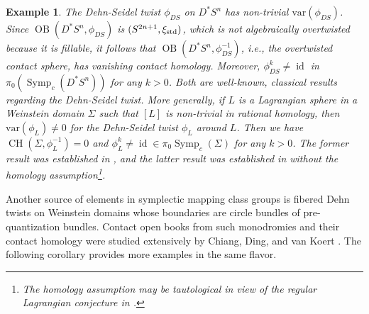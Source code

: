 \documentclass[11pt]{amsart}
\numberwithin{equation}{section}
\newtheorem{example}[theorem]{\textbf{Example}}
\def\std{\rm std}
\DeclareMathOperator{\Id}{id}
\DeclareMathOperator{\symp}{Symp}
\DeclareMathOperator{\OB}{OB}
\DeclareMathOperator{\CH}{CH}
\begin{document}
\begin{example}
    The Dehn-Seidel twist $\phi_{DS}$ on $D^*S^n$ has non-trivial $\mathrm{var}(\phi_{DS})$. Since $\OB(D^*S^n,\phi_{DS})$ is $(S^{2n+1},\xi_{\std})$, which is not algebraically overtwisted because it is fillable, it follows that $\OB(D^*S^n,\phi_{DS}^{-1})$, i.e., the overtwisted contact sphere, has vanishing contact homology. Moreover, $\phi_{DS}^k\ne \Id$ in $\pi_0(\symp_c(D^*S^n))$ for any $k>0$. Both are well-known, classical results regarding the Dehn-Seidel twist. More generally, if $L$ is a Lagrangian sphere in a Weinstein domain $\Sigma$ such that $[L]$ is non-trivial in rational homology, then $\mathrm{var}(\phi_{L})\ne 0$ for the Dehn-Seidel twist $\phi_L$ around $L$. Then we have $\CH(\Sigma,\phi_L^{-1})=0$ and $\phi_L^k \ne \Id \in \pi_0\symp_c(\Sigma)$ for any $k>0$. The former result was established in \cite{+1}, and the latter result was established in \cite{BGZ} without the homology assumption\footnote{The homology assumption may be tautological in view of the regular Lagrangian conjecture in \cite[Problem 2.5]{zbMATH07195660}.}.  
\end{example}

Another source of elements in symplectic mapping class groups is fibered Dehn twists on Weinstein domains whose boundaries are circle bundles of pre-quantization bundles. Contact open books from such monodromies and their contact homology were studied extensively by Chiang, Ding, and van Koert \cite{zbMATH06359114,zbMATH06562001}. The following corollary provides more examples in the same flavor.
\end{document}

